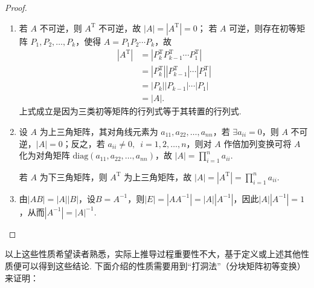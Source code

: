 \begin{proof}
\begin{enumerate}[start=2]
        \item 若 $A$ 不可逆，则 $A^\mathrm{T}$ 不可逆，故 $|A| = |A^\mathrm{T}| = 0$；
            若 $A$ 可逆，则存在初等矩阵 $P_1, P_2, \ldots, P_k$，使得 $A = P_1 P_2 \cdots P_k$，故
            \begin{align*}
                |A^\mathrm{T}| &= |P_k^\mathrm{T} P_{k-1}^\mathrm{T} \cdots P_1^\mathrm{T}| \\
                      &= |P_k^\mathrm{T}| |P_{k-1}^\mathrm{T}| \cdots |P_1^\mathrm{T}| \\
                      &= |P_k| |P_{k-1}| \cdots |P_1| \\
                      &= |A|.
            \end{align*}
            上式成立是因为三类初等矩阵的行列式等于其转置的行列式.

        \item 设 $A$ 为上三角矩阵，其对角线元素为 $a_{11}, a_{22}, \ldots, a_{nn}$，若 $\exists a_{ii} = 0$，则 $A$ 不可逆，$|A| = 0$；反之，若 $a_{ii} \neq 0, \enspace i=1,2,\ldots,n$，则对 $A$ 作倍加列变换可将 $A$ 化为对角矩阵 $\mathrm{diag}(a_{11},a_{22},\ldots,a_{nn})$，故 $|A| = \prod_{i=1}^n a_{ii}$.

            若 $A$ 为下三角矩阵，则 $A^\mathrm{T}$ 为上三角矩阵，故 $|A| = |A^\mathrm{T}| = \prod_{i=1}^n a_{ii}$.

        \item 由$|AB|=|A||B|$，设$B=A^{-1}$，则$|E|=|AA^{-1}|=|A||A^{-1}|$，因此$|A||A^{-1}|=1$，从而$|A^{-1}|=|A|^{-1}$.
    \end{enumerate}
\end{proof}

以上这些性质希望读者熟悉，实际上推导过程重要性不大，基于定义或上述其他性质便可以得到这些结论. 下面介绍的性质需要用到``打洞法''（分块矩阵初等变换）来证明：

